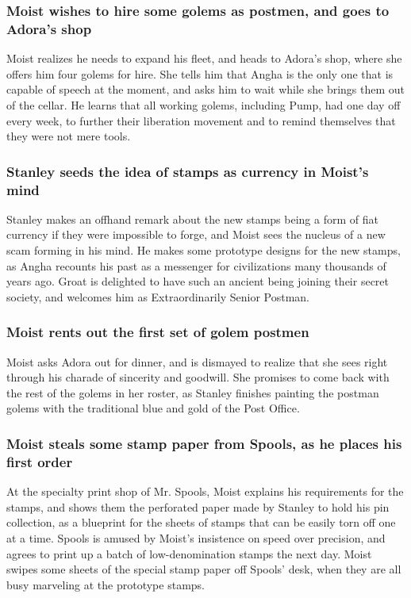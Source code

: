 \subsubsection{\Gls{Moist} wishes to hire some golems as postmen, and goes to \Gls{Adora}'s shop}
\Gls{Moist} realizes he needs to expand his fleet, and heads to \Gls{Adora}'s shop, where she offers
him four golems for hire. She tells him that \Gls{Angha} is the only one that is capable of speech
at the moment, and asks him to wait while she brings them out of the cellar. He learns that all
working golems, including \Gls{Pump}, had one day off every week, to further their liberation
movement and to remind themselves that they were not mere tools.

\subsubsection{\Gls{Stanley} seeds the idea of stamps as currency in \Gls{Moist}'s mind}
\Gls{Stanley} makes an offhand remark about the new stamps being a form of fiat currency if they
were impossible to forge, and \Gls{Moist} sees the nucleus of a new scam forming in his mind. He
makes some prototype designs for the new stamps, as \Gls{Angha} recounts his past as a messenger for
civilizations many thousands of years ago. \Gls{Groat} is delighted to have such an ancient being
joining their secret society, and welcomes him as Extraordinarily Senior Postman.

\subsubsection{\Gls{Moist} rents out the first set of golem postmen}
\Gls{Moist} asks \Gls{Adora} out for dinner, and is dismayed to realize that she sees right through
his charade of sincerity and goodwill. She promises to come back with the rest of the golems in
her roster, as \Gls{Stanley} finishes painting the postman golems with the traditional blue and
gold of the Post Office.

\subsubsection{\Gls{Moist} steals some stamp paper from \Gls{Spools}, as he places his first order}
At the specialty print shop of Mr. \Gls{Spools}, \Gls{Moist} explains his requirements for the
stamps, and shows them the perforated paper made by \Gls{Stanley} to hold his pin collection, as a
blueprint for the sheets of stamps that can be easily torn off one at a time. \Gls{Spools} is
amused by \Gls{Moist}'s insistence on speed over precision, and agrees to print up a batch of
low-denomination stamps the next day. \Gls{Moist} swipes some sheets of the special stamp paper off
\Gls{Spools}' desk, when they are all busy marveling at the prototype stamps.

